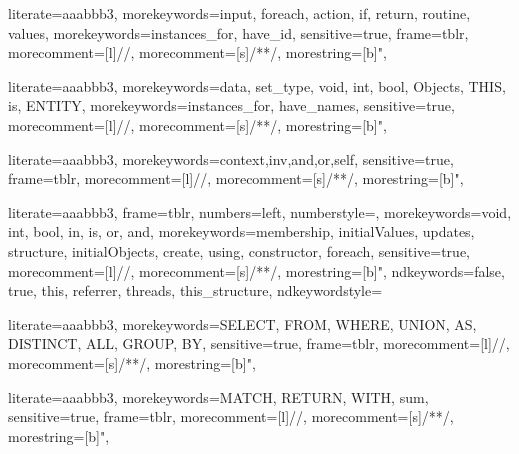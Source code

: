 
{
literate={aaa}{bbb}3,
morekeywords={input, foreach, action, if, return, routine, values},
morekeywords={instances_for, have_id},
sensitive=true,
frame=tblr,
morecomment=[l]{//},
morecomment=[s]{/*}{*/},
morestring=[b]",
}

{
literate={aaa}{bbb}3,
morekeywords={data, set_type, void, int, bool, Objects, THIS, is, ENTITY},
morekeywords={instances_for, have_names},
sensitive=true,
morecomment=[l]{//},
morecomment=[s]{/*}{*/},
morestring=[b]",
}

{
literate={aaa}{bbb}3,
morekeywords={context,inv,and,or,self},
sensitive=true,
frame=tblr,
morecomment=[l]{//},
morecomment=[s]{/*}{*/},
morestring=[b]",
}

{
literate={aaa}{bbb}3,
frame=tblr,
numbers=left,
numberstyle=\color{black}\scriptsize,
morekeywords={void, int, bool, in, is, or, and},
morekeywords={membership, initialValues, updates, structure, initialObjects, create, using, constructor, foreach},
sensitive=true,
morecomment=[l]{//},
morecomment=[s]{/*}{*/},
morestring=[b]",
ndkeywords={false, true, this, referrer, threads, this_structure},
ndkeywordstyle=\color{blue}\bfseries
}

{
literate={aaa}{bbb}3,
morekeywords={SELECT, FROM, WHERE, UNION, AS, DISTINCT, ALL, GROUP, BY},
sensitive=true,
frame=tblr,
morecomment=[l]{//},
morecomment=[s]{/*}{*/},
morestring=[b]",
}

{
literate={aaa}{bbb}3,
morekeywords={MATCH, RETURN, WITH, sum},
sensitive=true,
frame=tblr,
morecomment=[l]{//},
morecomment=[s]{/*}{*/},
morestring=[b]",
}
